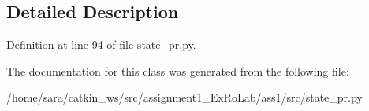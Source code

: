 \subsection{Detailed Description}


Definition at line 94 of file state\+\_\+pr.\+py.



The documentation for this class was generated from the following file\+:\begin{DoxyCompactItemize}
\item 
/home/sara/catkin\+\_\+ws/src/assignment1\+\_\+\+Ex\+Ro\+Lab/ass1/src/state\+\_\+pr.\+py\end{DoxyCompactItemize}
